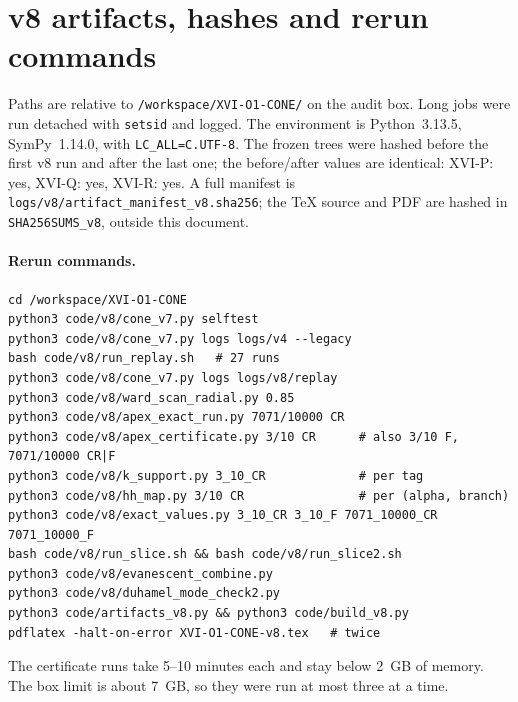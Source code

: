 \documentclass[11pt,a4paper]{article}
\newcommand{\loc}[1]{\nolinkurl{#1}}
\theoremstyle{plain}
\theoremstyle{definition}
\theoremstyle{remark}
\numberwithin{equation}{section}
\begin{document}
\section{v8 artifacts, hashes and rerun commands}
\label{app:v8artifacts}

Paths are relative to \loc{/workspace/XVI-O1-CONE/} on the audit box.
Long jobs were run detached with \loc{setsid} and logged. The
environment is Python~3.13.5, SymPy~1.14.0, with \loc{LC_ALL=C.UTF-8}.
The frozen trees were hashed before the first v8 run and after the last
one; the before/after values are identical: XVI-P: yes, XVI-Q: yes, XVI-R: yes.
A full manifest is \loc{logs/v8/artifact_manifest_v8.sha256}; the
\TeX{} source and PDF are hashed in \loc{SHA256SUMS_v8}, outside this
document.

\paragraph{Rerun commands.}
\begin{verbatim}
cd /workspace/XVI-O1-CONE
python3 code/v8/cone_v7.py selftest
python3 code/v8/cone_v7.py logs logs/v4 --legacy
bash code/v8/run_replay.sh   # 27 runs
python3 code/v8/cone_v7.py logs logs/v8/replay
python3 code/v8/ward_scan_radial.py 0.85
python3 code/v8/apex_exact_run.py 7071/10000 CR
python3 code/v8/apex_certificate.py 3/10 CR      # also 3/10 F, 7071/10000 CR|F
python3 code/v8/k_support.py 3_10_CR             # per tag
python3 code/v8/hh_map.py 3/10 CR                # per (alpha, branch)
python3 code/v8/exact_values.py 3_10_CR 3_10_F 7071_10000_CR 7071_10000_F
bash code/v8/run_slice.sh && bash code/v8/run_slice2.sh
python3 code/v8/evanescent_combine.py
python3 code/v8/duhamel_mode_check2.py
python3 code/artifacts_v8.py && python3 code/build_v8.py
pdflatex -halt-on-error XVI-O1-CONE-v8.tex   # twice
\end{verbatim}
The certificate runs take 5--10 minutes each and stay below 2~GB of
memory. The box limit is about 7~GB, so they were run at most three
at a time.
\end{document}
